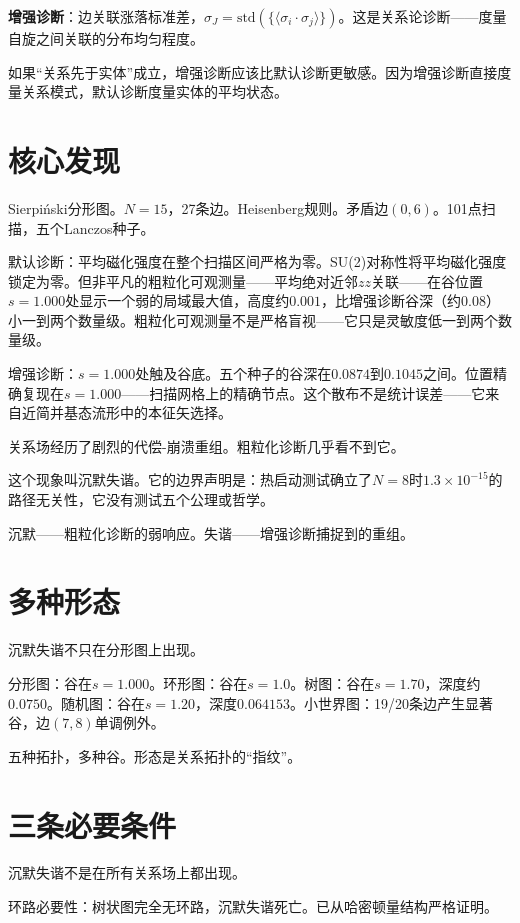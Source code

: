 \documentclass[11pt,a4paper]{book}
\theoremstyle{definition}
\begin{document}
\textbf{增强诊断}：边关联涨落标准差，$\sigma_J = \text{std}(\{\langle\sigma_i\cdot\sigma_j\rangle\})$。这是关系论诊断——度量自旋之间关联的分布均匀程度。

如果“关系先于实体”成立，增强诊断应该比默认诊断更敏感。因为增强诊断直接度量关系模式，默认诊断度量实体的平均状态。

\section*{核心发现}

Sierpiński分形图。$N=15$，27条边。Heisenberg规则。矛盾边$(0,6)$。101点扫描，五个Lanczos种子。

默认诊断：平均磁化强度在整个扫描区间严格为零。SU(2)对称性将平均磁化强度锁定为零。但非平凡的粗粒化可观测量——平均绝对近邻$zz$关联——在谷位置$s=1.000$处显示一个弱的局域最大值，高度约$0.001$，比增强诊断谷深（约$0.08$）小一到两个数量级。粗粒化可观测量不是严格盲视——它只是灵敏度低一到两个数量级。

增强诊断：$s=1.000$处触及谷底。五个种子的谷深在$0.0874$到$0.1045$之间。位置精确复现在$s=1.000$——扫描网格上的精确节点。这个散布不是统计误差——它来自近简并基态流形中的本征矢选择。

关系场经历了剧烈的代偿-崩溃重组。粗粒化诊断几乎看不到它。

这个现象叫沉默失谐。它的边界声明是：热启动测试确立了$N=8$时$1.3\times10^{-15}$的路径无关性，它没有测试五个公理或哲学。

沉默——粗粒化诊断的弱响应。失谐——增强诊断捕捉到的重组。

\section*{多种形态}

沉默失谐不只在分形图上出现。

分形图：谷在$s=1.000$。环形图：谷在$s=1.0$。树图：谷在$s=1.70$，深度约$0.0750$。随机图：谷在$s=1.20$，深度$0.064153$。小世界图：19/20条边产生显著谷，边$(7,8)$单调例外。

五种拓扑，多种谷。形态是关系拓扑的“指纹”。

\section*{三条必要条件}

沉默失谐不是在所有关系场上都出现。

环路必要性：树状图完全无环路，沉默失谐死亡。已从哈密顿量结构严格证明。
\end{document}
